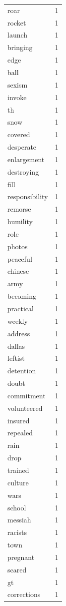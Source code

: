 \begin{tabular}{lr}
roar & 1 \\
rocket & 1 \\
launch & 1 \\
bringing & 1 \\
edge & 1 \\
ball & 1 \\
sexism & 1 \\
invoke & 1 \\
th & 1 \\
snow & 1 \\
covered & 1 \\
desperate & 1 \\
enlargement & 1 \\
destroying & 1 \\
fill & 1 \\
responsibility & 1 \\
remorse & 1 \\
humility & 1 \\
role & 1 \\
photos & 1 \\
peaceful & 1 \\
chinese & 1 \\
army & 1 \\
becoming & 1 \\
practical & 1 \\
weekly & 1 \\
address & 1 \\
dallas & 1 \\
leftist & 1 \\
detention & 1 \\
doubt & 1 \\
commitment & 1 \\
volunteered & 1 \\
insured & 1 \\
repealed & 1 \\
rain & 1 \\
drop & 1 \\
trained & 1 \\
culture & 1 \\
wars & 1 \\
school & 1 \\
messiah & 1 \\
racists & 1 \\
town & 1 \\
pregnant & 1 \\
scared & 1 \\
gt & 1 \\
corrections & 1 \\

\end{tabular}
